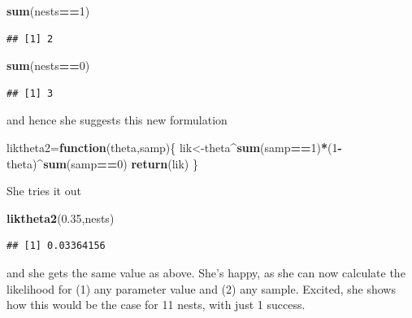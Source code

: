 \documentclass[
]{book}
\newenvironment{Shaded}{\begin{snugshade}}{\end{snugshade}}
\newcommand{\ControlFlowTok}[1]{\textcolor[rgb]{0.13,0.29,0.53}{\textbf{#1}}}
\newcommand{\DecValTok}[1]{\textcolor[rgb]{0.00,0.00,0.81}{#1}}
\newcommand{\FloatTok}[1]{\textcolor[rgb]{0.00,0.00,0.81}{#1}}
\newcommand{\KeywordTok}[1]{\textcolor[rgb]{0.13,0.29,0.53}{\textbf{#1}}}
\newcommand{\NormalTok}[1]{#1}
\newcommand{\OperatorTok}[1]{\textcolor[rgb]{0.81,0.36,0.00}{\textbf{#1}}}
\begin{document}
\begin{Shaded}
\begin{Highlighting}[]
\KeywordTok{sum}\NormalTok{(nests}\OperatorTok{==}\DecValTok{1}\NormalTok{)}
\end{Highlighting}
\end{Shaded}

\begin{verbatim}
## [1] 2
\end{verbatim}

\begin{Shaded}
\begin{Highlighting}[]
\KeywordTok{sum}\NormalTok{(nests}\OperatorTok{==}\DecValTok{0}\NormalTok{)}
\end{Highlighting}
\end{Shaded}

\begin{verbatim}
## [1] 3
\end{verbatim}

and hence she suggests this new formulation

\begin{Shaded}
\begin{Highlighting}[]
\NormalTok{liktheta2=}\ControlFlowTok{function}\NormalTok{(theta,samp)\{}
\NormalTok{  lik<-theta}\OperatorTok{^}\KeywordTok{sum}\NormalTok{(samp}\OperatorTok{==}\DecValTok{1}\NormalTok{)}\OperatorTok{*}\NormalTok{(}\DecValTok{1}\OperatorTok{-}\NormalTok{theta)}\OperatorTok{^}\KeywordTok{sum}\NormalTok{(samp}\OperatorTok{==}\DecValTok{0}\NormalTok{)}
  \KeywordTok{return}\NormalTok{(lik)}
\NormalTok{\}}
\end{Highlighting}
\end{Shaded}

She tries it out

\begin{Shaded}
\begin{Highlighting}[]
\KeywordTok{liktheta2}\NormalTok{(}\FloatTok{0.35}\NormalTok{,nests)}
\end{Highlighting}
\end{Shaded}

\begin{verbatim}
## [1] 0.03364156
\end{verbatim}

and she gets the same value as above. She's happy, as she can now calculate the likelihood for (1) any parameter value and (2) any sample. Excited, she shows how this would be the case for 11 nests, with just 1 success.
\end{document}
